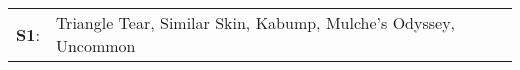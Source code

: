 \begin{supertabular}{p{0.03\textwidth}p{0.92\textwidth}}
 \textbf{S1}:  &  Triangle Tear\textsuperscript{}, \enspace Similar Skin\textsuperscript{}, \enspace Kabump\textsuperscript{}, \enspace Mulche's Odyssey\textsuperscript{}, \enspace Uncommon\textsuperscript{}  \enspace  \\
\end{supertabular}

